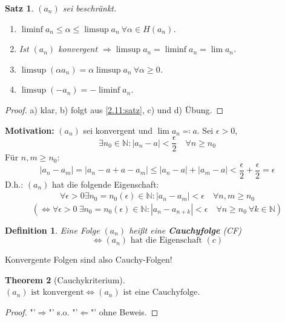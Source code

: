 \documentclass[titlepage,ngerman,a4paper,headsepline]{scrartcl}
\newcommand{\N}{\mathbb{N}}
\theoremstyle{named}
\newtheorem{namedtheorem}{Theorem} \counterwithin{namedtheorem}{section}
\theoremstyle{dotless}
\newtheorem{satz}[namedtheorem]{Satz}
\newtheorem*{definition}{Definition}
\begin{document}
\begin{satz} \label{2.14:satz}
	$(a_{n})$ sei beschränkt.
	\begin{enumerate}
		\item $\liminf a_{n} \leq \alpha \leq \limsup a_{n} ~\forall \alpha \in H(a_{n})$.
		\item Ist $(a_{n})$ konvergent $\Rightarrow \limsup a_{n} = \liminf a_{n} = \lim a_{n}$.
		\item $\limsup(\alpha a_{n}) = \alpha \limsup a_{n} ~\forall \alpha \geq 0$.
		\item $\limsup(-a_{n}) = - \liminf a_{n}$.
	\end{enumerate}
\end{satz}

\begin{proof}
	a) klar, b) folgt aus \ref{2.11:satz}, c) und d) Übung.
\end{proof}


\textbf{Motivation:} $(a_{n})$ sei konvergent und $\lim a_{n} \eqqcolon a$. Sei $\epsilon > 0$,
	$$ \exists n_{0} \in \N: |a_{n} - a| < \frac{\epsilon}{2} \quad \forall n \geq n_{0} $$
Für $n, m \geq n_{0}$:
	$$ |a_{n} - a_{m}| = |a_{n} - a + a - a_{m} | \leq |a_{n} - a| + |a_{m} - a| < \frac{\epsilon}{2} + \frac{\epsilon}{2} = \epsilon $$
D.h.: $(a_{n})$ hat die folgende Eigenschaft:
	\begin{align*}
		\forall \epsilon > 0 \exists n_{0} = n_{0}(\epsilon) \in \N: |a_{n} - a_{m}| < \epsilon \quad \forall n,m \geq n_{0} \tag{c}
	\end{align*}
$$ (\iff \forall \epsilon > 0 ~\exists n_{0} = n_{0}(\epsilon) \in \N: |a_{n} - a_{n+k}| < \epsilon \quad \forall n \geq n_{0} ~\forall k \in \N) $$

\begin{definition} 
	Eine Folge $(a_{n})$ hei{\ss}t eine \textbf{Cauchyfolge} (CF)
	$$ \iff (a_{n}) \text{ hat die Eigenschaft } (c) $$	
\end{definition}


Konvergente Folgen sind also Cauchy-Folgen!

\begin{namedtheorem}[Cauchykriterium] $(a_{n}) \text{ ist konvergent} \iff (a_{n}) \text{ ist eine Cauchyfolge}$. \label{2.15:prop} 
\end{namedtheorem}

\begin{proof}
	"'$\Rightarrow$"' s.o. "'$\Leftarrow$"' ohne Beweis.
\end{proof}
\end{document}
